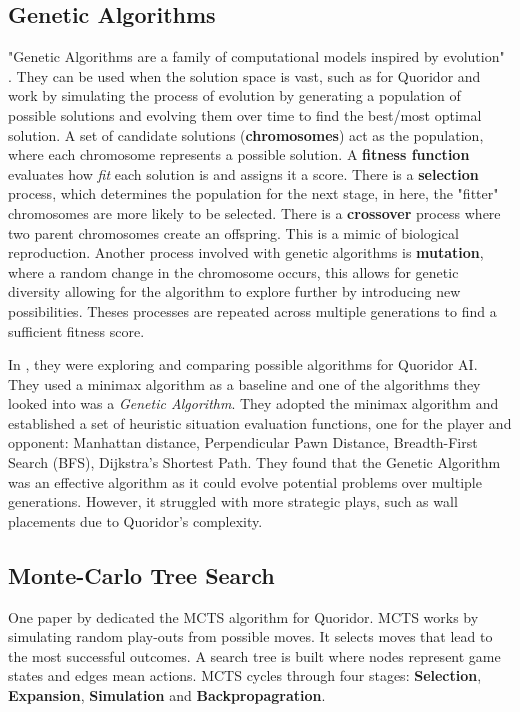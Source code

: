 \documentclass[review]{cmpreport}
\begin{document}
	\subsection{Genetic Algorithms}
	"Genetic Algorithms are a family of computational models inspired by evolution" \cite{mathew2012genetic}. They can be used when the solution space is vast, such as for Quoridor and work by simulating the process of evolution by generating a population of possible solutions and evolving them over time to find the best/most optimal solution. A set of candidate solutions (\textbf{chromosomes}) act as the population, where each chromosome represents a possible solution. A \textbf{fitness function} evaluates how \textit{fit} each solution is and assigns it a score. There is a \textbf{selection} process, which determines the population for the next stage, in here, the "fitter" chromosomes are more likely to be selected. There is a \textbf{crossover} process where two parent chromosomes create an offspring. This is a mimic of biological reproduction. Another process involved with genetic algorithms is \textbf{mutation}, where a random change in the chromosome occurs, this allows for genetic diversity allowing for the algorithm to explore further by introducing new possibilities. Theses processes are repeated across multiple generations to find a sufficient fitness score.
	
	\noindent In \cite{josequoridor}, they were exploring and comparing possible algorithms for Quoridor AI. They used a minimax algorithm as a baseline and one of the algorithms they looked into was a \textit{Genetic Algorithm}.
	They adopted the minimax algorithm and established a set of heuristic situation evaluation functions, one for the player and opponent: Manhattan distance, Perpendicular Pawn Distance, Breadth-First Search (BFS), Dijkstra's Shortest Path. They found that the Genetic Algorithm was an effective algorithm as it could evolve potential problems over multiple generations. However, it struggled with more strategic plays, such as wall placements due to Quoridor's complexity.
	
	\subsection{Monte-Carlo Tree Search}
	One paper by \cite{respall2018monte} dedicated the MCTS algorithm for Quoridor. 
	MCTS works by simulating random play-outs from possible moves. It selects moves that lead to the most successful outcomes. A search tree is built where nodes represent game states and edges mean actions. MCTS cycles through four stages: \textbf{Selection}, \textbf{Expansion}, \textbf{Simulation} and \textbf{Backpropagration}.
	
\end{document}
